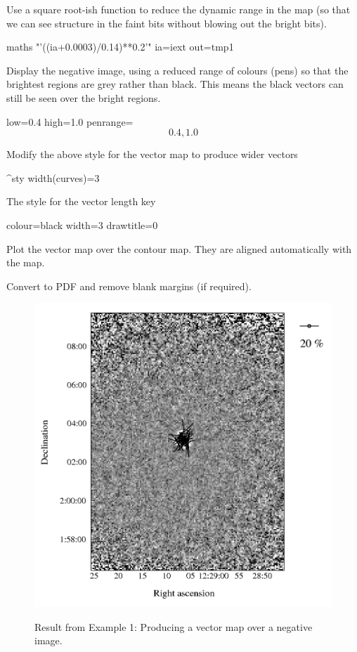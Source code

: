 Use a square root-ish function to reduce the dynamic range in the map (so
that we can see structure in the faint bits without blowing out the
bright bits).

\begin{terminalv}
maths "'((ia+0.0003)/0.14)**0.2'" ia=iext out=tmp1
\end{terminalv}


Display the negative image, using a reduced range of colours
(pens) so that the brightest regions are grey rather than black.
This means the black vectors can still be seen over the bright
regions.

\begin{terminalv}
        low=0.4 high=1.0
        penrange=\[0.4,1.0\]
\end{terminalv}


Modify the above style for the vector map to produce wider vectors

\begin{terminalv}
^sty
width(curves)=3
\end{terminalv}


The style for the vector length key

\begin{terminalv}
colour=black
width=3
drawtitle=0
\end{terminalv}


Plot the vector map over the contour map. They are aligned automatically with the map.

\begin{terminalv}
\end{terminalv}


Convert to PDF and remove blank margins (if required).

\begin{terminalv}
\end{terminalv}


\begin{figure}[t!]
\begin{center}
\includegraphics[width=0.75\linewidth]{sc22-kappa-plots-plot3.png}
\label{fig:kappa-plot3}
\caption [Vector map with negative image in polplot]{
  \small Result from Example 1: Producing a vector map over a negative image. 
}
\end{center}
\end{figure}


